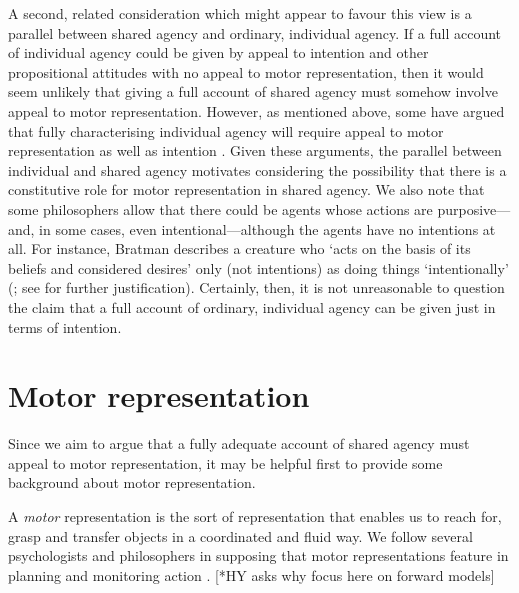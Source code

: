 \documentclass[12pt,\papersize]{extarticle}
\begin{document}
{\label{text:second_consideration} A second, related consideration} which might appear to favour this view is a parallel between shared agency and ordinary, individual agency.
If a full account of individual agency could be given by appeal to intention and other propositional attitudes with no appeal to motor representation,
then it would seem unlikely that giving a full account of shared agency must somehow involve appeal to motor representation.
However, as mentioned above, some have argued that fully characterising individual agency will require appeal to motor representation as well as intention \citep{pacherie:2000_content,butterfill:2012_intention}. 
Given these arguments, the parallel between individual and shared agency motivates considering the possibility that  there is a constitutive role for motor representation in shared agency. 
We also note that some philosophers allow that there could be agents whose actions are purposive---and, in some cases, even intentional---although  the agents have no intentions at all.
For instance, Bratman describes a creature who `acts on the basis of its beliefs and considered desires' only (not intentions) as doing things `intentionally' (\citeyear[p.\ 251]{bratman:2000_valuing}; see \citealp[pp.\ 137--8]{Bratman:1987xw} for further justification). 
Certainly, then, it is not unreasonable to question the claim that a full account of ordinary, individual agency can be given just in terms of intention. 


\section{Motor representation}
Since we aim to argue that a fully adequate account of shared agency must appeal to motor representation, it may be helpful first to provide some background about motor representation.

A \textit{motor} representation is the sort of representation that enables us to reach for, grasp and transfer objects in a coordinated and fluid way.  
We follow several psychologists and philosophers in supposing that motor representations feature in planning and monitoring action \citep[e.g.][]{wolpert:1995internal, miall:1996_forward}.
[*HY asks why focus here on forward models]
\end{document}

